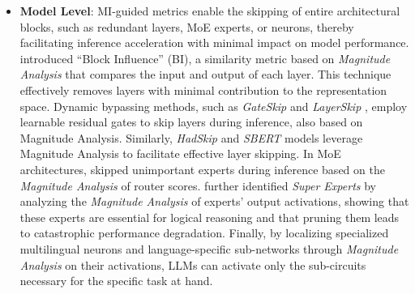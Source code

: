 \documentclass[11pt,letterpaper]{mystyle}
\begin{document}
\begin{itemize}[leftmargin=*]
  \item \textbf{Model Level}: 
  MI-guided metrics enable the skipping of entire architectural blocks, such as redundant layers, MoE experts, or neurons, thereby facilitating inference acceleration with minimal impact on model performance.
  \citet{men-etal-2025-shortgpt} introduced “Block Influence” (BI), a similarity metric based on \textit{Magnitude Analysis} that compares the input and output of each layer. This technique effectively removes layers with minimal contribution to the representation space.
  Dynamic bypassing methods, such as \textit{GateSkip} \citep{laitenberger2025layerswhenlearningskip} and \textit{LayerSkip} \citep{elhoushi-etal-2024-layerskip}, employ learnable residual gates to skip layers during inference, also based on Magnitude Analysis. 
  Similarly, \textit{HadSkip} \citep{wang-etal-2023-hadskip} and \textit{SBERT} \citep{shelke2024towards} models leverage Magnitude Analysis to facilitate effective layer skipping.
  In MoE architectures, \citet{lu2024not} skipped unimportant experts during inference based on the \textit{Magnitude Analysis} of router scores.
  \citet{su2025unveiling} further identified \textit{Super Experts} by analyzing the \textit{Magnitude Analysis} of experts' output activations, showing that these experts are essential for logical reasoning and that pruning them leads to catastrophic performance degradation.
  Finally, by localizing specialized multilingual neurons \citep{liu2024unraveling} and language-specific sub-networks \citep{tan-etal-2024-neuron} through \textit{Magnitude Analysis} on their activations, LLMs can activate only the sub-circuits necessary for the specific task at hand.
  \end{itemize}
  
\end{document}
